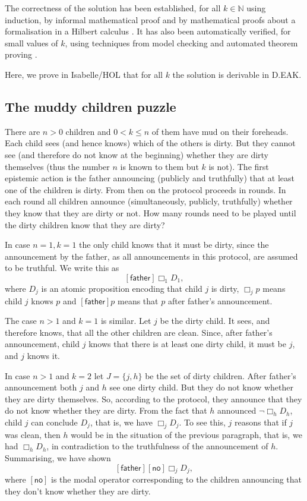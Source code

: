 \documentclass[runningheads,a4paper]{llncs}
\begin{document}
The correctness of the solution has been established, for all $k\in\mathbb{N}$ using induction,  by informal mathematical proof \cite{FHMV} and by mathematical proofs about a formalisation in a Hilbert calculus \cite{MaPS14}. It has also been automatically verified, for small values of $k$, using techniques from model checking \cite{HalpernVardi}  and automated theorem proving \cite{Dyckhoff,Truffaut:msc}.

Here, we prove in Isabelle/HOL that for all $k$ the solution is derivable in D.EAK.

\subsection{The muddy children puzzle}
There are $n>0$ children and $0 < k \leq n$ of them have mud on their foreheads. Each child sees (and hence knows) which of the others is dirty. But they cannot see (and therefore do not know at the beginning) whether they are dirty themselves (thus the number $n$ is known to them but $k$ is not). The first epistemic action is the father announcing (publicly and truthfully) that at least one of the children is dirty. From then on the protocol proceeds in rounds. In each round all children announce (simultaneously, publicly, truthfully) whether they know that they are dirty or not. How many rounds need to be played until the dirty children know that they are dirty?

\newcommand{\father}{\textsf{father}}
\newcommand{\no}{\textsf{no}}

\medskip\noindent In case $n=1,k=1$ the only child knows that it must be dirty, since the announcement by the father, as all announcements in this protocol, are assumed to be truthful. We write this as 
$$[\father]\Box_1 D_1,$$
where $D_j$ is an atomic proposition encoding that child $j$ is dirty, $\Box_j p$ means child $j$ knows $p$ and $[\father]p$ means that $p$ after father's announcement.

\medskip\noindent The case $n>1$ and $k=1$ is similar. Let $j$ be the dirty child. It sees, and therefore knows, that all the other children are clean. Since, after father's announcement, child $j$ knows that there is at least one dirty child, it must be $j$, and $j$ knows it.

\medskip\noindent In case $n>1$ and $k=2$ let $J=\{j,h\}$ be the set of dirty children. After father's announcement both $j$ and $h$ see one dirty child. But they do not know whether they are dirty themselves. So, according to the protocol, they announce that they do not know whether they are dirty. From the fact that $h$ announced $\neg\Box_h D_h$, child $j$ can conclude $D_j$, that is, we have $\Box_j D_j$.
To see this, $j$ reasons that if $j$ was clean, then $h$ would be in the situation of the previous paragraph, that is, we had $\Box_h D_h$, in contradiction to the truthfulness of the announcement of $h$.
Summarising, we have shown 
$$[\father][\no]\Box_j D_j,$$
where $[\no]$ is the modal operator corresponding to the children announcing that they don't know whether they are dirty. 
\end{document}
